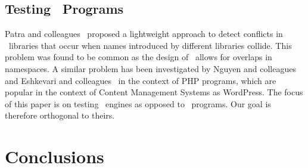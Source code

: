\documentclass[10pt,conference,anonymous]{IEEEtran}
\begin{document}
\subsection{Testing \js\ Programs}
Patra and colleagues~\cite{Patra:2018:CFU:3180155.3180184} proposed a
lightweight approach to detect conflicts in \js\ libraries that occur
when names introduced by different libraries collide. This problem was
found to be common as the design of \js\ allows for overlaps in
namespaces. A similar problem has been investigated by Nguyen and
colleagues~\cite{nguyen-etal-icse2014} and Eshkevari and
colleagues~\cite{eshkevari-etal-icpc2014} in the context of PHP
programs, which are popular in the context of Content Management
Systems as WordPress. The focus of this paper is on testing
\js\ engines as opposed to \js\ programs. Our goal is therefore
orthogonal to theirs.

\section{Conclusions}



%
\balance


\end{document}
